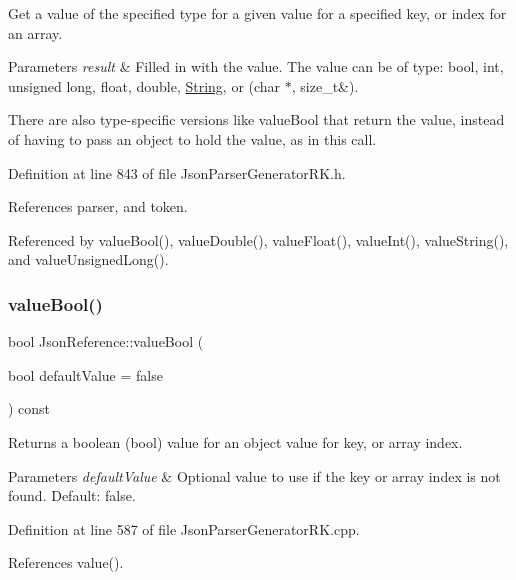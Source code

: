 Get a value of the specified type for a given value for a specified key, or index for an array. 


\begin{DoxyParams}{Parameters}
{\em result} & Filled in with the value. The value can be of type\+: bool, int, unsigned long, float, double, \hyperlink{class_string}{String}, or (char $\ast$, size\+\_\+t\&).\\
\hline
\end{DoxyParams}
There are also type-\/specific versions like value\+Bool that return the value, instead of having to pass an object to hold the value, as in this call. 

Definition at line 843 of file Json\+Parser\+Generator\+R\+K.\+h.



References parser, and token.



Referenced by value\+Bool(), value\+Double(), value\+Float(), value\+Int(), value\+String(), and value\+Unsigned\+Long().

\mbox{\label{class_json_reference_a45d8e15942d4f3cf79e6e7d0c9218acf}} 
\subsubsection{\texorpdfstring{value\+Bool()}{valueBool()}}
{\footnotesize\ttfamily bool Json\+Reference\+::value\+Bool (\begin{DoxyParamCaption}\item[{bool}]{default\+Value = {\ttfamily false} }\end{DoxyParamCaption}) const}



Returns a boolean (bool) value for an object value for key, or array index. 


\begin{DoxyParams}{Parameters}
{\em default\+Value} & Optional value to use if the key or array index is not found. Default\+: false. \\
\hline
\end{DoxyParams}


Definition at line 587 of file Json\+Parser\+Generator\+R\+K.\+cpp.



References value().

